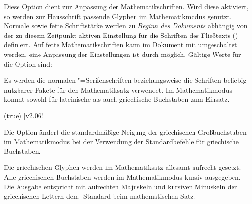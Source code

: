 \begin{DeclareEntity*}{}
\begin{DeclareEntity*}{}
\begin{DeclareEntity*}{}
\begin{Declaration}
Diese Option dient zur Anpassung der Mathematikschriften. Wird diese aktiviert, 
so werden zur Hausschrift passende Glyphen im Mathematikmodus genutzt. Normale 
sowie fette Schriftstärke werden zu \emph{Beginn des Dokuments} abhängig von 
der zu diesem Zeitpunkt aktiven Einstellung für die Schriften des Fließtexts 
() definiert. Auf fette Mathematikschriften kann im 
Dokument mit  umgeschaltet werden, eine Anpassung der 
Einstellungen ist durch  möglich. Gültige Werte für die 
Option  sind:
\begin{DeclareValues}{}
  Es werden die normalen "=Serifenschriften beziehungsweise 
  die Schriften beliebig nutzbarer Pakete für den Mathematiksatz verwendet.
  Im Mathematikmodus kommt \OpenSans sowohl für lateinische als auch 
  griechische Buchstaben zum Einsatz.
\end{DeclareValues}
\end{Declaration}

\begin{Declaration}
  {}
  (true)
  [v2.06!]

Die Option ändert die standardmäßige Neigung der griechischen Großbuchstaben im 
Mathematikmodus bei der Verwendung der Standardbefehle für griechische 
Buchstaben.
\begin{DeclareValues}{}
  Die griechischen Glyphen werden im Mathematiksatz allesamt aufrecht gesetzt.
  Alle griechischen Buchstaben werden im Mathematikmodus kursiv ausgegeben.
  Die Ausgabe entspricht mit aufrechten Majuskeln und kursiven Minuskeln der 
  griechischen Lettern dem -Standard beim mathematischen Satz.
\end{DeclareValues}
\end{Declaration}


\end{DeclareEntity*}
\end{DeclareEntity*}
\end{DeclareEntity*}

